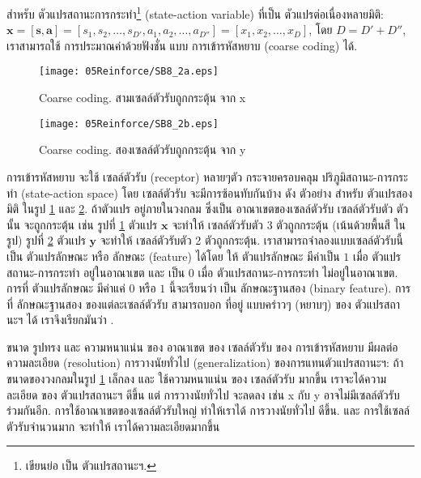 สำหรับ ตัวแปรสถานะการกระทำ\footnote{
เขียนย่อ เป็น ตัวแปรสถานะฯ.} (state-action variable) ที่เป็น ตัวแปรต่อเนื่องหลายมิติ: $\textbf{x} = [\textbf{s},\textbf{a}] = [s_1, s_2, \ldots, s_{D'}, a_1, a_2, \ldots, a_{D''}] = [x_1, x_2, \ldots, x_D]$, โดย $D = D' + D''$, เราสามารถใช้ การประมาณค่าด้วยฟังชั่น แบบ การเข้ารหัสหยาบ (coarse coding) ได้.

%
\begin{figure}
\begin{center}
\texttt{[image: 05Reinforce/SB8\_2a.eps]}
\end{center}
\caption{Coarse coding. สามเซลล์ตัวรับถูกกระตุ้น จาก x}
\label{fig: SuttonBarto 8.2 a}
\end{figure}

%
\begin{figure}
\begin{center}
\texttt{[image: 05Reinforce/SB8\_2b.eps]}
\end{center}
\caption{Coarse coding. สองเซลล์ตัวรับถูกกระตุ้น จาก y}
\label{fig: SuttonBarto 8.2 b}
\end{figure}

การเข้ารหัสหยาบ จะใช้ เซลล์ตัวรับ (receptor) หลายๆตัว กระจายครอบคลุม ปริภูมิสถานะ-การกระทำ (state-action space) โดย เซลล์ตัวรับ จะมีการซ้อนทับกันบ้าง ดัง ตัวอย่าง สำหรับ ตัวแปรสองมิติ ในรูป \ref{fig: SuttonBarto 8.2 a} และ \ref{fig: SuttonBarto 8.2 b}.
ถ้าตัวแปร อยู่ภายในวงกลม ซึ่งเป็น อาณาเขตของเซลล์ตัวรับ เซลล์ตัวรับตัว ตัวนั้น จะถูกกระตุ้น เช่น รูปที่ \ref{fig: SuttonBarto 8.2 a} ตัวแปร $\textbf{x}$ จะทำให้ เซลล์ตัวรับตัว 3 ตัวถูกกระตุ้น (เน้นด้วยพื้นสี ในรูป)
รูปที่ \ref{fig: SuttonBarto 8.2 b} ตัวแปร $\textbf{y}$ จะทำให้ เซลล์ตัวรับตัว 2 ตัวถูกกระตุ้น.
เราสามารถจำลองแบบเซลล์ตัวรับนี้เป็น ตัวแปรลักษณะ หรือ ลักษณะ (feature) ได้โดย ให้ ตัวแปรลักษณะ มีค่าเป็น $1$ เมื่อ ตัวแปรสถานะ-การกระทำ อยู่ในอาณาเขต และ เป็น $0$ เมื่อ ตัวแปรสถานะ-การกระทำ ไม่อยู่ในอาณาเขต.
การที่ ตัวแปรลักษณะ มีค่าแค่ $0$ หรือ $1$ นี้จะเรียนว่า เป็น ลักษณะฐานสอง (binary feature).
%
การที่ ลักษณะฐานสอง ของแต่ละเซลล์ตัวรับ สามารถบอก ที่อยู่ แบบคร่าวๆ (หยาบๆ) ของ ตัวแปรสถานะฯ ได้ เราจึงเรียกมันว่า .

ขนาด รูปทรง และ ความหนาแน่น ของ อาณาเขต ของ เซลล์ตัวรับ ของ การเข้ารหัสหยาบ มีผลต่อ ความละเอียด (resolution)  การวางนัยทั่วไป (generalization) ของการแทนตัวแปรสถานะฯ:
ถ้าขนาดของวงกลมในรูป \ref{fig: SuttonBarto 8.2 a} เล็กลง และ ใช้ความหนาแน่น ของ เซลล์ตัวรับ มากขึ้น เราจะได้ความละเอียด ของ ตัวแปรสถานะฯ ดีขึ้น
แต่ การวางนัยทั่วไป จะลดลง เช่น x กับ y อาจไม่มีเซลล์ตัวรับร่วมกันอีก.
การใช้อาณาเขตของเซลล์ตัวรับใหญ่ ทำให้เราได้ การวางนัยทั่วไป ดีขึ้น.
และ การใช้เซลล์ตัวรับจำนวนมาก จะทำให้ เราได้ความละเอียดมากขึ้น

